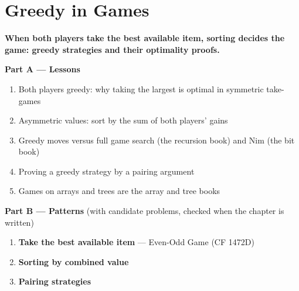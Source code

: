 \chapter{Greedy in Games}
\label{ch:games}

\begin{tcolorbox}[enhanced, colback=white, colframe=secondaryblue, boxrule=1pt, arc=2mm]
\textbf{\large\textcolor{primaryblue}{When both players take the best available item, sorting decides the game: greedy strategies and their optimality proofs.}}
\end{tcolorbox}


\begin{plannedbox}
\textbf{Part A --- Lessons}
\begin{enumerate}[leftmargin=*, label=\textbf{A\arabic*.}, itemsep=1pt]
    \item Both players greedy: why taking the largest is optimal in symmetric take-games
    \item Asymmetric values: sort by the sum of both players' gains
    \item Greedy moves versus full game search (the recursion book) and Nim (the bit book)
    \item Proving a greedy strategy by a pairing argument
    \item Games on arrays and trees are the array and tree books
\end{enumerate}
\textbf{Part B --- Patterns} (with candidate problems, checked when the chapter is written)
\begin{enumerate}[leftmargin=*, label=\textbf{P\arabic*.}, itemsep=1pt]
    \item \textbf{Take the best available item} --- Even-Odd Game {\small\color{darkgray}(CF 1472D)}
    \item \textbf{Sorting by combined value}
    \item \textbf{Pairing strategies}
\end{enumerate}
\end{plannedbox}
